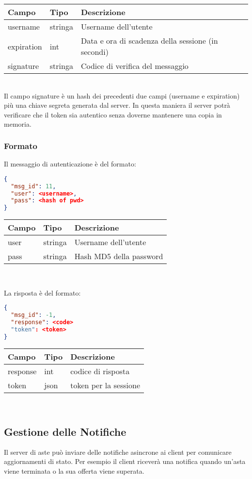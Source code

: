 \begin{tabular}{|l | l | l|}
\hline
Campo & Tipo & Descrizione \\ \hline
username & stringa & Username dell'utente \\ \hline
expiration & int & Data e ora di scadenza della sessione (in secondi) \\ \hline
signature & stringa & Codice di verifica del messaggio\\ \hline
\end{tabular}\\

Il campo signature è un hash dei precedenti due campi (username e expiration) più una chiave segreta generata dal server.
In questa maniera il server potrà verificare che il token sia autentico senza doverne mantenere una copia in memoria.
\subsubsection{Formato}
Il messaggio di autenticazione è del formato:
\begin{lstlisting}[language=json]
{
  "msg_id": 11,
  "user": <username>,
  "pass": <hash of pwd>
}
\end{lstlisting}

\begin{tabular}{|l | l | l |}
\hline
Campo & Tipo & Descrizione \\ \hline
user & stringa & Username dell'utente \\ \hline
pass & stringa & Hash MD5 della password \\ \hline
\end{tabular} \\
\vspace*{1em}

La risposta è del formato:
\begin{lstlisting}[language=json]
{
  "msg_id": -1,
  "response": <code>
  "token": <token>
}
\end{lstlisting}

\begin{tabular}{|l | l | l |}
\hline
Campo & Tipo & Descrizione \\ \hline
response & int & codice di risposta  \\ \hline
token & json & token per la sessione \\ \hline
\end{tabular} \\
\subsection{Gestione delle Notifiche}
Il server di aste può inviare delle notifiche asincrone ai client per comunicare aggiornamenti di stato.
Per esempio il client riceverà una notifica quando un'asta viene terminata o la sua offerta viene superata.\\

